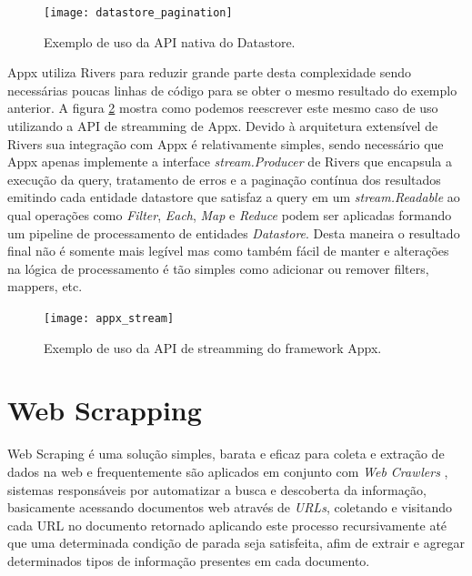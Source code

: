 \begin{figure}[H]
  \texttt{[image: datastore\_pagination]}
  \centering
  \caption{Exemplo de uso da API nativa do Datastore.}
  \label{code:datastore:pagination}
\end{figure}

Appx utiliza Rivers para reduzir grande parte desta complexidade sendo necessárias poucas linhas de código para se obter o mesmo resultado do exemplo anterior. A figura \ref{code:appx:stream} mostra como podemos reescrever este mesmo caso de uso utilizando a API de streamming de Appx. Devido à arquitetura extensível de Rivers sua integração com Appx é relativamente simples, sendo necessário que Appx apenas implemente a interface \emph{stream.Producer} de Rivers que encapsula a execução da query, tratamento de erros e a paginação contínua dos resultados emitindo cada entidade datastore que satisfaz a query em um \emph{stream.Readable} ao qual operações como \emph{Filter}, \emph{Each}, \emph{Map} e \emph{Reduce} podem ser aplicadas formando um pipeline de processamento de entidades \emph{Datastore}. Desta maneira o resultado final não é somente mais legível mas como também fácil de manter e alterações na lógica de processamento é tão simples como adicionar ou remover filters, mappers, etc. 

\begin{figure}[H]
  \texttt{[image: appx\_stream]}
  \centering
  \caption{Exemplo de uso da API de streamming do framework Appx.}
  \label{code:appx:stream}
\end{figure}

\section{Web Scrapping}
\label{sec:web_scrapping}

Web Scraping \cite{article:webharvy:scrapping} é uma solução simples, barata e eficaz para coleta e extração de dados na web e frequentemente são aplicados em conjunto com \emph{Web Crawlers} \cite{article:howstuffworks:web_crawler}, sistemas responsáveis por automatizar a busca e descoberta da informação, basicamente acessando documentos web através de \emph{URLs}, coletando e visitando cada URL no documento retornado aplicando este processo recursivamente até que uma determinada condição de parada seja satisfeita, afim de extrair e agregar determinados tipos de informação presentes em cada documento.

